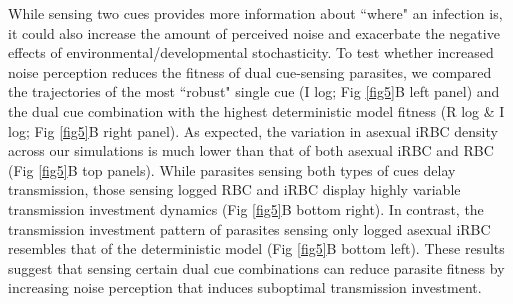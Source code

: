 \documentclass[10pt,letterpaper]{article}
\begin{document}
While sensing two cues provides more information about ``where" an infection is, it could also increase the amount of perceived noise and exacerbate the negative effects of environmental/developmental stochasticity. To test whether increased noise perception reduces the fitness of dual cue-sensing parasites, we compared the trajectories of the most ``robust" single cue (I log; Fig \ref{fig5}B left panel) and the dual cue combination with the highest deterministic model fitness (R log \& I log; Fig \ref{fig5}B right panel). As expected, the variation in asexual iRBC density across our simulations is much lower than that of both asexual iRBC and RBC (Fig \ref{fig5}B top panels). While parasites sensing both types of cues delay transmission, those sensing logged RBC and iRBC display highly variable transmission investment dynamics (Fig \ref{fig5}B bottom right). In contrast, the transmission investment pattern of parasites sensing only logged asexual iRBC resembles that of the deterministic model (Fig \ref{fig5}B bottom left). These results suggest that sensing certain dual cue combinations can reduce parasite fitness by increasing noise perception that induces suboptimal transmission investment.
\end{document}

